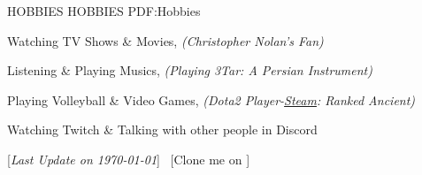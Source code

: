 \documentclass[letterpaper,MMMyyyy,nonstopmode]{resume}
\newcommand{\CVNote}{Last Update on \today}
\begin{document}
\begin{Body}

\Section
{HOBBIES}
{HOBBIES}
{PDF:Hobbies}

\BigGap
\BulletItem
Watching TV Shows \& Movies, \textit{(Christopher Nolan's Fan)}

\Gap
\BulletItem
Listening \& Playing Musics, \textit{(Playing 3Tar: A Persian Instrument)}

\Gap
\BulletItem
Playing Volleyball \& Video Games, \textit{(Dota2 Player-\href{https://steamcommunity.com/id/aliyazdi/}{Steam}: Ranked Ancient)}

\Gap
\BulletItem
Watching Twitch \& Talking with other people in Discord


\UseNoteFont
\BigGap
\hfill
[\textit{\CVNote}]
\SubBulletSymbol\,
[Clone me on
\href{https://github.com/aliyazdi75/Resume}
{\faGithub}]

\end{Body}
\end{document}
